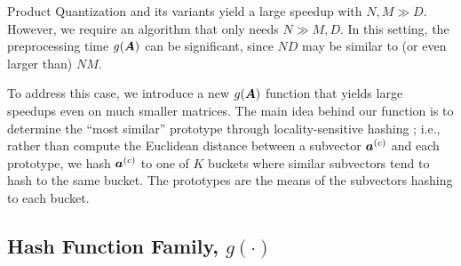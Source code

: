 

Product Quantization and its variants yield a large speedup with $N, M \gg D$. However, we require an algorithm that only needs $N \gg M, D$. In this setting, the preprocessing time $g(\bm{A})$ can be significant, since $ND$ may be similar to (or even larger than) $NM$.

To address this case, we introduce a new $g(\bm{A})$ function that yields large speedups even on much smaller matrices. %
The main idea behind our function is to determine the ``most similar'' prototype through locality-sensitive hashing \cite{lshOrig}; i.e., rather than compute the Euclidean distance between a subvector $\bm{a}^{(c)}$ and each prototype, we hash $\bm{a}^{(c)}$ to one of $K$ buckets where similar subvectors tend to hash to the same bucket. The prototypes are the means of the subvectors hashing to each bucket.%


\vspace{-1mm}
\subsection{Hash Function Family, $g(\cdot)$}

